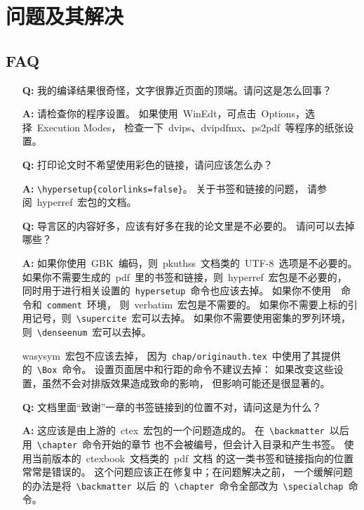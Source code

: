 \chapter{问题及其解决}
	\section{FAQ\label{sec:faq}}
	\begin{enumerate}
		\item[\textbf{Q:}]
		我的编译结果很奇怪，文字很靠近页面的顶端。请问这是怎么回事？

		\item[\textbf{A:}]
		请检查你的程序设置。
		如果使用~WinEdt，可点击~Options，选择~Execution Modes，
		检查一下~dvips、dvipdfmx、ps2pdf~等程序的纸张设置。

		\item[\textbf{Q:}]
		打印论文时不希望使用彩色的链接，请问应该怎么办？

		\item[\textbf{A:}]
		\verb|\hypersetup{colorlinks=false}|。
		关于书签和链接的问题，
		请参阅~hyperref~宏包的文档\supercite{hyperref-doc}。

		\item[\textbf{Q:}]
		导言区的内容好多，应该有好多在我的论文里是不必要的。
		请问可以去掉哪些？

		\item[\textbf{A:}]
		如果你使用~GBK~编码，则~pkuthss~文档类的~UTF-8~选项是不必要的。
		如果你不需要生成的~pdf~里的书签和链接，则~hyperref~宏包是不必要的，
		同时用于进行相关设置的~\verb|hypersetup|~命令也应该去掉。
		如果你不使用~\verb||~命令和~\verb|comment|~环境，
		则~verbatim~宏包是不需要的。
		如果你不需要上标的引用记号，则~\verb|\supercite|~宏可以去掉。
		如果你不需要使用密集的罗列环境，则~\verb|\denseenum|~宏可以去掉。

		wasysym~宏包不应该去掉，
		因为~\verb|chap/originauth.tex|~中使用了其提供的~\verb|\Box|~命令。
		设置页面居中和行距的命令不建议去掉：
		如果改变这些设置，虽然不会对排版效果造成致命的影响，
		但影响可能还是很显著的。

		\item[\textbf{Q:}]
		文档里面“致谢”一章的书签链接到的位置不对，请问这是为什么？

		\item[\textbf{A:}]
		这应该是由上游的~ctex~宏包的一个问题造成的。
		在~\verb|\backmatter|~以后用~\verb|\chapter|~命令开始的章节%
		也不会被编号，但会计入目录和产生书签。
		使用当前版本的~ctexbook~文档类的~pdf~文档%
		的这一类书签和链接指向的位置常常是错误的。
		这个问题应该正在修复中；在问题解决之前，
		一个缓解问题的办法是将~\verb|\backmatter|~以后%
		的~\verb|\chapter|~命令全部改为~\verb|\specialchap|~命令。
	\end{enumerate}


